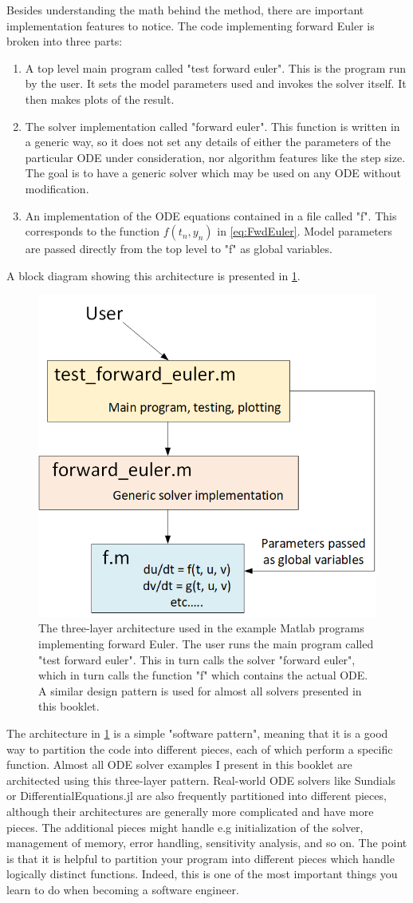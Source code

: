 \documentclass[hidelinks,notitlepage]{book}
\begin{document}
Besides understanding the math behind the method, there are important implementation features to notice.  The code implementing forward Euler is broken into three parts:  
\begin{enumerate}
\item A top level main program called "test forward euler".  This is the program run by the user.  It sets the model parameters used and invokes the solver itself.  It then makes plots of the result.
\item The solver implementation called "forward euler".  This function is written in a generic way, so it does not set any details of either the parameters of the particular ODE under consideration, nor algorithm features like the step size.  The goal is to have a generic solver which may be used on any ODE without modification.
\item An implementation of the ODE equations contained in a file called "f".  This corresponds to the function $f(t_n, y_n)$ in \cref{eq:FwdEuler}.  Model parameters are passed directly from the top level to "f" as global variables.
\end{enumerate}
A block diagram showing this architecture is presented in \cref{fig:ForwardEulerArch}.  
\begin{figure}[tbh]
	\centering
	\includegraphics[width=0.5\columnwidth]{ForwardEulerArch.png}
	\caption{The three-layer architecture used in the example Matlab programs implementing forward Euler.  The user runs the main program called "test forward euler".  This in turn calls the solver "forward euler", which in turn calls the function "f" which contains the actual ODE.  A similar design pattern is used for almost all solvers presented in this booklet.}
	\label{fig:ForwardEulerArch}
\end{figure}
The architecture in \cref{fig:ForwardEulerArch} is a simple "software pattern", meaning that it is a good way to partition the code into different pieces, each of which perform a specific function.  Almost all ODE solver examples I present in this booklet are architected using this three-layer pattern.  Real-world ODE solvers like Sundials or DifferentialEquations.jl are also frequently partitioned into different pieces, although their architectures are generally more complicated and have more pieces.  The additional pieces might handle e.g initialization of the solver, management of memory, error handling, sensitivity analysis, and so on.  The point is that it is helpful to partition your program into different pieces which handle logically distinct functions.  Indeed, this is one of the most important things you learn to do when becoming a software engineer.
\end{document}
